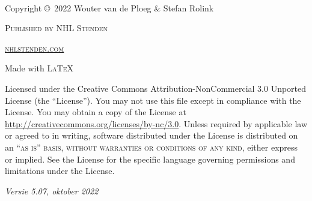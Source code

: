 \documentclass[11pt,fleqn]{book} %
\begin{document}

\newpage
~\vfill
\thispagestyle{empty}

\noindent Copyright \copyright\ 2022 Wouter van de Ploeg \& Stefan Rolink %

\noindent \textsc{Published by NHL Stenden} %

\noindent \textsc{\href{http://www.nhlstenden.com}{nhlstenden.com}} %

\noindent Made with \textsc{\LaTeX}

\noindent Licensed under the Creative Commons Attribution-NonCommercial 3.0 Unported License (the ``License''). You may not use this file except in compliance with the License. You may obtain a copy of the License at \url{http://creativecommons.org/licenses/by-nc/3.0}. Unless required by applicable law or agreed to in writing, software distributed under the License is distributed on an \textsc{``as is'' basis, without warranties or conditions of any kind}, either express or implied. See the License for the specific language governing permissions and limitations under the License. %

\noindent \textit{Versie 5.07, oktober 2022} %




\pagestyle{empty} %

\renewcommand{\contentsname}{Inhoudsopgave}
\tableofcontents %

\cleardoublepage %

\pagestyle{fancy} %

\end{document}
